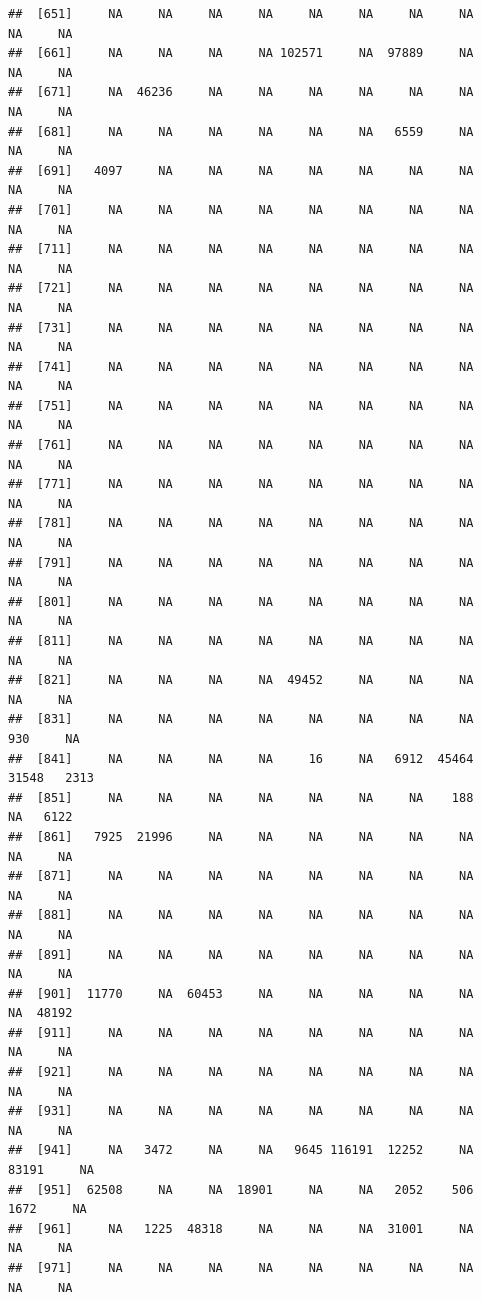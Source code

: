 \documentclass[11pt,a4paper,]{article}
\begin{document}
\begin{verbatim}
##  [651]     NA     NA     NA     NA     NA     NA     NA     NA     NA     NA
##  [661]     NA     NA     NA     NA 102571     NA  97889     NA     NA     NA
##  [671]     NA  46236     NA     NA     NA     NA     NA     NA     NA     NA
##  [681]     NA     NA     NA     NA     NA     NA   6559     NA     NA     NA
##  [691]   4097     NA     NA     NA     NA     NA     NA     NA     NA     NA
##  [701]     NA     NA     NA     NA     NA     NA     NA     NA     NA     NA
##  [711]     NA     NA     NA     NA     NA     NA     NA     NA     NA     NA
##  [721]     NA     NA     NA     NA     NA     NA     NA     NA     NA     NA
##  [731]     NA     NA     NA     NA     NA     NA     NA     NA     NA     NA
##  [741]     NA     NA     NA     NA     NA     NA     NA     NA     NA     NA
##  [751]     NA     NA     NA     NA     NA     NA     NA     NA     NA     NA
##  [761]     NA     NA     NA     NA     NA     NA     NA     NA     NA     NA
##  [771]     NA     NA     NA     NA     NA     NA     NA     NA     NA     NA
##  [781]     NA     NA     NA     NA     NA     NA     NA     NA     NA     NA
##  [791]     NA     NA     NA     NA     NA     NA     NA     NA     NA     NA
##  [801]     NA     NA     NA     NA     NA     NA     NA     NA     NA     NA
##  [811]     NA     NA     NA     NA     NA     NA     NA     NA     NA     NA
##  [821]     NA     NA     NA     NA  49452     NA     NA     NA     NA     NA
##  [831]     NA     NA     NA     NA     NA     NA     NA     NA    930     NA
##  [841]     NA     NA     NA     NA     16     NA   6912  45464  31548   2313
##  [851]     NA     NA     NA     NA     NA     NA     NA    188     NA   6122
##  [861]   7925  21996     NA     NA     NA     NA     NA     NA     NA     NA
##  [871]     NA     NA     NA     NA     NA     NA     NA     NA     NA     NA
##  [881]     NA     NA     NA     NA     NA     NA     NA     NA     NA     NA
##  [891]     NA     NA     NA     NA     NA     NA     NA     NA     NA     NA
##  [901]  11770     NA  60453     NA     NA     NA     NA     NA     NA  48192
##  [911]     NA     NA     NA     NA     NA     NA     NA     NA     NA     NA
##  [921]     NA     NA     NA     NA     NA     NA     NA     NA     NA     NA
##  [931]     NA     NA     NA     NA     NA     NA     NA     NA     NA     NA
##  [941]     NA   3472     NA     NA   9645 116191  12252     NA  83191     NA
##  [951]  62508     NA     NA  18901     NA     NA   2052    506   1672     NA
##  [961]     NA   1225  48318     NA     NA     NA  31001     NA     NA     NA
##  [971]     NA     NA     NA     NA     NA     NA     NA     NA     NA     NA

\end{verbatim}
\end{document}
